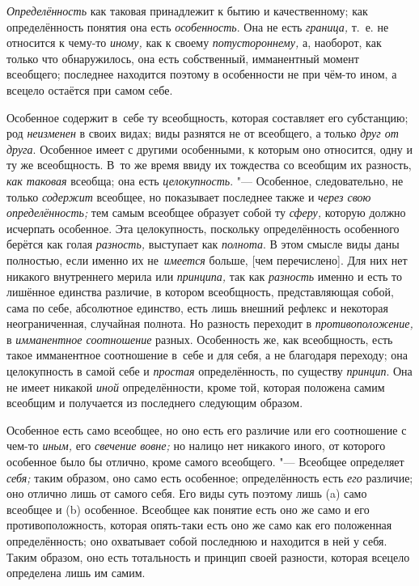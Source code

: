 {\em Определённость} как таковая принадлежит к бытию и качественному; как
определённость понятия она есть {\em особенность}. Она не есть {\em граница,}
т.~е. не относится к чему-то {\em иному,} как к своему {\em потустороннему,} а,
наоборот, как только что обнаружилось, она есть собственный, имманентный момент
всеобщего; последнее находится поэтому в особенности не при чём-то ином, а
всецело остаётся при самом себе.

Особенное содержит в~себе ту всеобщность, которая составляет его субстанцию;
род {\em неизменен} в своих видах; виды разнятся не от всеобщего, а только
{\em друг от друга}. Особенное имеет с другими особенными, к которым оно
относится, одну и ту же всеобщность. В~то же время ввиду их тождества со
всеобщим их разность,
{\em как таковая} всеобща; она есть {\em целокупность}. "--- Особенное,
следовательно, не только {\em содержит} всеобщее, но показывает последнее
также и {\em через свою определённость;} тем самым всеобщее образует собой
ту {\em сферу,} которую должно исчерпать особенное. Эта целокупность, поскольку
определённость особенного берётся как голая {\em разность,} выступает как
{\em полнота}. В этом смысле виды даны полностью, если именно их
не~{\em имеется} больше, [чем перечислено]. Для них нет никакого внутреннего
мерила или {\em принципа,} так как {\em разность} именно и есть то лишённое
единства различие, в котором всеобщность, представляющая собой, сама по себе,
абсолютное единство, есть лишь внешний рефлекс и некоторая неограниченная,
случайная полнота. Но разность переходит в {\em противоположение,}
в {\em имманентное соотношение} разных. Особенность же, как всеобщность, есть
такое имманентное соотношение в~себе и для себя, а не благодаря переходу; она
целокупность в самой себе и {\em простая} определённость, по существу
{\em принцип}. Она не имеет никакой {\em иной} определённости, кроме той,
которая положена самим всеобщим и получается из последнего следующим образом.

Особенное есть само всеобщее, но оно есть его различие или его
соотношение с чем-то {\em иным,} его {\em свечение
вовне;} но налицо нет никакого иного, от которого особенное было бы отлично,
кроме самого всеобщего. "--- Всеобщее определяет {\em себя;} таким
образом, оно само есть особенное; определённость есть {\em его} различие; оно
отлично лишь от самого себя. Его виды суть поэтому лишь (a)
само всеобщее и (b) особенное. Всеобщее как понятие есть оно
же само и его противоположность, которая опять-таки есть оно же само как
его положенная определённость; оно охватывает собой последнюю и находится в
ней у себя. Таким образом, оно есть тотальность и принцип своей разности,
которая всецело определена лишь им самим.

